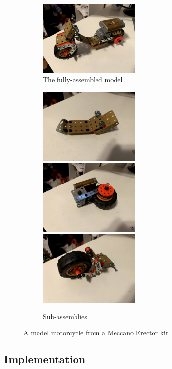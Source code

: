 \begin{figure}
  \begin{subfigure}{\textwidth}
    \includegraphics[width=5cm]{figures/erector/full.jpg}
    \caption{The fully-assembled model}
  \end{subfigure}
  \begin{subfigure}{\textwidth}
    \includegraphics[width=5cm]{figures/erector/sub1.jpg}
    \includegraphics[width=5cm]{figures/erector/sub2.jpg}
    \includegraphics[width=5cm]{figures/erector/sub3.jpg}
    \caption{Sub-assemblies}
  \end{subfigure}
  \caption{A model motorcycle from a Meccano Erector kit
  }\label{fig:erector}
\end{figure}

\subsection{Implementation}

